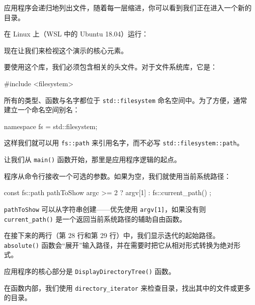 应用程序会递归地列出文件，随着每一层缩进，你可以看到我们正在进入一个新的目录。

在 Linux 上（WSL 中的 Ubuntu 18.04）运行：


现在让我们来检视这个演示的核心元素。

要使用这个库，我们必须包含相关的头文件。对于文件系统库，它是：

\begin{codebox}[cpp]
#include <filesystem>
\end{codebox}

所有的类型、函数与名字都位于 \texttt{std::filesystem} 命名空间中。为了方便，通常建立一个命名空间别名：

\begin{codebox}[cpp]
namespace fs = std::filesystem;
\end{codebox}

这样我们就可以用 \texttt{fs::path} 来引用名字，而不必写 \texttt{std::filesystem::path}。

让我们从 \texttt{main()} 函数开始，那里是应用程序逻辑的起点。

程序从命令行接收一个可选的参数。如果为空，我们就使用当前系统路径：

\begin{codebox}[cpp]
const fs::path pathToShow{ argc >= 2 ? argv[1] : fs::current_path() };
\end{codebox}

\texttt{pathToShow} 可以从字符串创建——优先使用 \texttt{argv[1]}，如果没有则 \texttt{current\_path()} 是一个返回当前系统路径的辅助自由函数。

在接下来的两行（第 28 行和第 29 行）中，我们显示迭代的起始路径。\texttt{absolute()} 函数会“展开”输入路径，并在需要时把它从相对形式转换为绝对形式。

应用程序的核心部分是 \texttt{DisplayDirectoryTree()} 函数。

在函数内部，我们使用 \texttt{directory\_iterator} 来检查目录，找出其中的文件或更多的目录。


